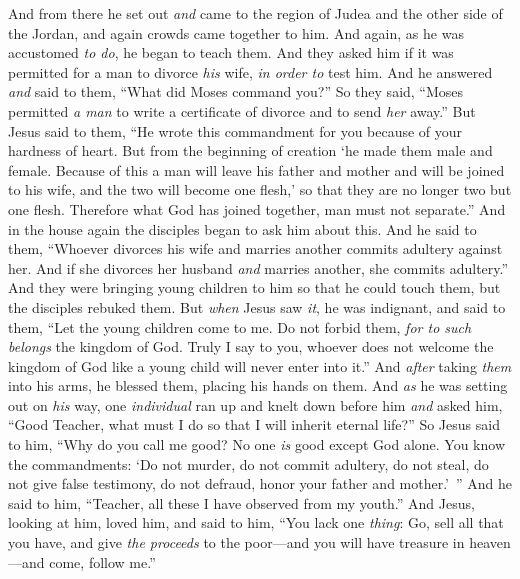 \begin{biblechapter} %
 And from there he set out \textit{and} came to the region of Judea and the other side of the Jordan, and again crowds came together to him. And again, as he was accustomed \textit{to do}, he began to teach them.
\verse And they asked him if it was permitted for a man to divorce \textit{his} wife, \textit{in order to} test him.
\verse And he answered \textit{and} said to them, “What did Moses command you?”
\verse So they said, “Moses permitted \textit{a man} to write a certificate of divorce and to send \textit{her} away.”
\verse But Jesus said to them, “He wrote this commandment for you because of your hardness of heart.
\verse But from the beginning of creation ‘he made them male and female.
\verse Because of this a man will leave his father and mother and will be joined to his wife,
\verse and the two will become one flesh,’ so that they are no longer two but one flesh.
\verse Therefore what God has joined together, man must not separate.”
\verse And in the house again the disciples began to ask him about this.
\verse And he said to them, “Whoever divorces his wife and marries another commits adultery against her.
\verse And if she divorces her husband \textit{and} marries another, she commits adultery.”
 And they were bringing young children to him so that he could touch them, but the disciples rebuked them.
\verse But \textit{when} Jesus saw \textit{it}, he was indignant, and said to them, “Let the young children come to me. Do not forbid them, \textit{for to such belongs} the kingdom of God.
\verse Truly I say to you, whoever does not welcome the kingdom of God like a young child will never enter into it.”
\verse And \textit{after} taking \textit{them} into his arms, he blessed them, placing his hands on them.
 And \textit{as} he was setting out on \textit{his} way, one \textit{individual} ran up and knelt down before him \textit{and} asked him, “Good Teacher, what must I do so that I will inherit eternal life?”
\verse So Jesus said to him, “Why do you call me good? No one \textit{is} good except God alone.
\verse You know the commandments: ‘Do not murder, do not commit adultery, do not steal, do not give false testimony, do not defraud, honor your father and mother.’ ”
\verse And he said to him, “Teacher, all these I have observed from my youth.”
\verse And Jesus, looking at him, loved him, and said to him, “You lack one \textit{thing}: Go, sell all that you have, and give \textit{the proceeds} to the poor—and you will have treasure in heaven—and come, follow me.”

\end{biblechapter}
